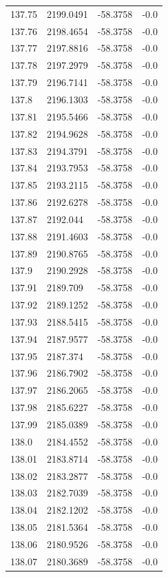 \begin{table}[H]
\begin{tabular}{llll}
137.75 & 2199.0491 & -58.3758 & -0.0 \\
137.76 & 2198.4654 & -58.3758 & -0.0 \\
137.77 & 2197.8816 & -58.3758 & -0.0 \\
137.78 & 2197.2979 & -58.3758 & -0.0 \\
137.79 & 2196.7141 & -58.3758 & -0.0 \\
137.8 & 2196.1303 & -58.3758 & -0.0 \\
137.81 & 2195.5466 & -58.3758 & -0.0 \\
137.82 & 2194.9628 & -58.3758 & -0.0 \\
137.83 & 2194.3791 & -58.3758 & -0.0 \\
137.84 & 2193.7953 & -58.3758 & -0.0 \\
137.85 & 2193.2115 & -58.3758 & -0.0 \\
137.86 & 2192.6278 & -58.3758 & -0.0 \\
137.87 & 2192.044 & -58.3758 & -0.0 \\
137.88 & 2191.4603 & -58.3758 & -0.0 \\
137.89 & 2190.8765 & -58.3758 & -0.0 \\
137.9 & 2190.2928 & -58.3758 & -0.0 \\
137.91 & 2189.709 & -58.3758 & -0.0 \\
137.92 & 2189.1252 & -58.3758 & -0.0 \\
137.93 & 2188.5415 & -58.3758 & -0.0 \\
137.94 & 2187.9577 & -58.3758 & -0.0 \\
137.95 & 2187.374 & -58.3758 & -0.0 \\
137.96 & 2186.7902 & -58.3758 & -0.0 \\
137.97 & 2186.2065 & -58.3758 & -0.0 \\
137.98 & 2185.6227 & -58.3758 & -0.0 \\
137.99 & 2185.0389 & -58.3758 & -0.0 \\
138.0 & 2184.4552 & -58.3758 & -0.0 \\
138.01 & 2183.8714 & -58.3758 & -0.0 \\
138.02 & 2183.2877 & -58.3758 & -0.0 \\
138.03 & 2182.7039 & -58.3758 & -0.0 \\
138.04 & 2182.1202 & -58.3758 & -0.0 \\
138.05 & 2181.5364 & -58.3758 & -0.0 \\
138.06 & 2180.9526 & -58.3758 & -0.0 \\
138.07 & 2180.3689 & -58.3758 & -0.0 \\

\end{tabular}
\end{table}
